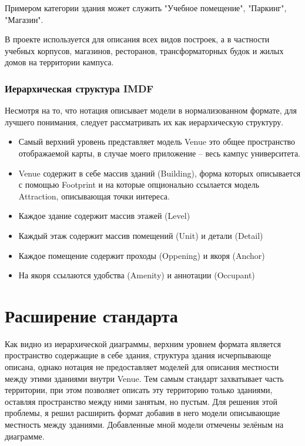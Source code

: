         Примером категории здания может служить "Учебное помещение", "Паркинг", "Магазин".

        В проекте используется для описания всех видов построек, а в частности учебных корпусов, магазинов, ресторанов, трансформаторных будок и жилых домов на территории кампуса.

    \subsubsection{Иерархическая структура IMDF}
      Несмотря на то, что нотация описывает модели в нормализованном формате, для лучшего понимания, следует рассматривать их как иерархическую структуру.


      \begin{itemize}
        \item Самый верхний уровень представляет модель Venue это общее пространство отображаемой карты, в случае моего приложение -- весь кампус университета.
        \item Venue содержит в себе массив зданий (Building), форма которых описывается с помощью Footprint и на которые опционально ссылается модель Attraction, описывающая точки интереса.
        \item Каждое здание содержит массив этажей (Level)
        \item Каждый этаж содержит массив помещений (Unit) и детали (Detail)
        \item Каждое помещение содержит проходы (Oppening) и якоря (Anchor)
        \item На якоря ссылаются удобства (Amenity) и аннотации (Occupant)
      \end{itemize}

  \section{Расширение стандарта}
    Как видно из иерархической диаграммы, верхним уровнем формата является пространство содержащие в себе здания, структура здания исчерпывающе описана, однако нотация не предоставляет моделей для описания местности между этими зданиями внутри Venue. Тем самым стандарт захватывает часть территории, при этом позволяет описать эту территорию только зданиями, оставляя пространство между ними занятым, но пустым.
    Для решения этой проблемы, я решил расширить формат добавив в него модели описывающие местность между зданиями. Добавленные мной модели отмечены зелёным на диаграмме.

